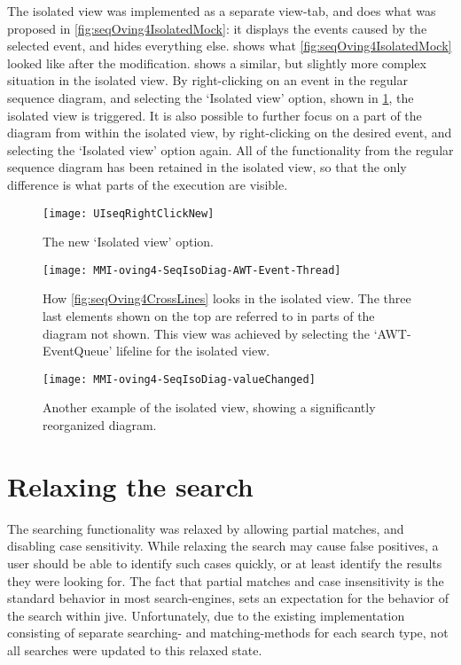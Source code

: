 The isolated view was implemented as a separate view-tab, and does what was proposed in \cref{fig:seqOving4IsolatedMock}: it displays the events caused by the selected event, and hides everything else.
 shows what \cref{fig:seqOving4IsolatedMock} looked like after the modification.
 shows a similar, but slightly more complex situation in the isolated view.
By right-clicking on an event in the regular sequence diagram, and selecting the `Isolated view' option, shown in \cref{fig:UISeqRightClickNew}, the isolated view is triggered.
It is also possible to further focus on a part of the diagram from within the isolated view, by right-clicking on the desired event, and selecting the `Isolated view' option again.
All of the functionality from the regular sequence diagram has been retained in the isolated view, so that the only difference is what parts of the execution are visible.
\begin{figure}[H]
	\centering
	\texttt{[image: UIseqRightClickNew]}
	\caption{The new `Isolated view' option.}
	\label{fig:UISeqRightClickNew}
\end{figure}

\begin{figure}[H]
	\centering
	\texttt{[image: MMI-oving4-SeqIsoDiag-AWT-Event-Thread]}
	\caption[How \cref{fig:seqOving4CrossLines} looks in the isolated view.]{How \cref{fig:seqOving4CrossLines} looks in the isolated view. The three last elements shown on the top are referred to in parts of the diagram not shown. This view was achieved by selecting the `AWT-EventQueue' lifeline for the isolated view.}
	\label{fig:MMI-oving4-SeqIsoDiag-AWT-Event-Thread}
\end{figure}

\begin{figure}[H]
	\centering
	\texttt{[image: MMI-oving4-SeqIsoDiag-valueChanged]}
	\caption{Another example of the isolated view, showing a significantly reorganized diagram.}
	\label{fig:MMI-oving4-SeqIsoDiag-valueChanged}
\end{figure}

\section{Relaxing the search}\label{implSearch}
The searching functionality was relaxed by allowing partial matches, and disabling case sensitivity.
While relaxing the search may cause false positives, a user should be able to identify such cases quickly, or at least identify the results they were looking for.
The fact that partial matches and case insensitivity is the standard behavior in most search-engines, sets an expectation for the behavior of the search within \gls{jive}.
Unfortunately, due to the existing implementation consisting of separate searching- and matching-methods for each search type, not all searches were updated to this relaxed state.

